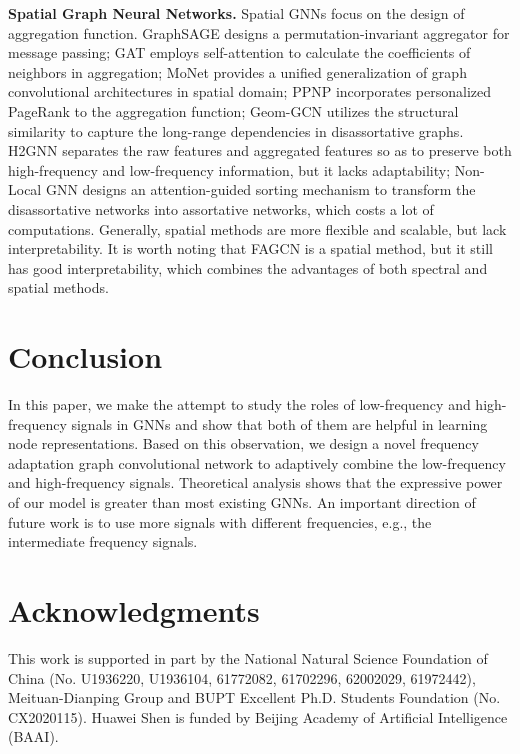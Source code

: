 \documentclass[letterpaper]{article} %
\begin{document}
\textbf{Spatial Graph Neural Networks.} Spatial GNNs focus on the design of aggregation function. GraphSAGE \cite{GraphSAGE} designs a permutation-invariant aggregator for message passing; GAT \cite{GAT} employs self-attention to calculate the coefficients of neighbors in aggregation; MoNet \cite{MoNet} provides a unified generalization of graph convolutional architectures in spatial domain; PPNP \cite{PPNP} incorporates personalized PageRank to the aggregation function;
Geom-GCN \cite{GeomGCN} utilizes the structural similarity to capture the long-range dependencies in disassortative graphs.
H2GNN \cite{H2GNN} separates the raw features and aggregated features so as to preserve both high-frequency and low-frequency information, but it lacks adaptability;
Non-Local GNN \cite{Non-Local} designs an attention-guided sorting mechanism to transform the disassortative networks into assortative networks, which costs a lot of computations.
Generally, spatial methods are more flexible and scalable, but lack interpretability.
It is worth noting that FAGCN is a spatial method, but it still has good interpretability, which combines the advantages of both spectral and spatial methods.

\section{Conclusion}

In this paper, we make the attempt to study the roles of low-frequency and high-frequency signals in GNNs and show that both of them are helpful in learning node representations. Based on this observation, we design a novel frequency adaptation graph convolutional network to adaptively combine the low-frequency and high-frequency signals. Theoretical analysis shows that the expressive power of our model is greater than most existing GNNs.
An important direction of future work is to use more signals with different frequencies, e.g., the intermediate frequency signals.

\section{Acknowledgments}
This work is supported in part by the National Natural Science Foundation of China (No. U1936220, U1936104, 61772082, 61702296, 62002029, 61972442), Meituan-Dianping Group and BUPT Excellent Ph.D. Students Foundation (No. CX2020115). Huawei Shen is funded by Beijing Academy of Artificial Intelligence (BAAI).


% 

\end{document}
